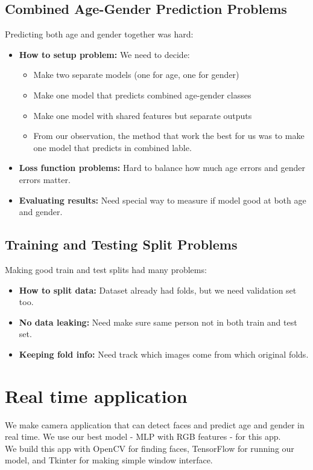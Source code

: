 \documentclass{article}
\begin{document}
\subsection{Combined Age-Gender Prediction Problems}
Predicting both age and gender together was hard:

\begin{itemize}
    \item \textbf{How to setup problem:} We need to decide:
    \begin{itemize}
        \item Make two separate models (one for age, one for gender)
        \item Make one model that predicts combined age-gender classes
        \item Make one model with shared features but separate outputs
        \item From our observation, the method that work the best for us was to make one model that predicts in combined lable.
    \end{itemize}



    \item \textbf{Loss function problems:} Hard to balance how much age errors and gender errors matter.

    \item \textbf{Evaluating results:} Need special way to measure if model good at both age and gender.
\end{itemize}

\subsection{Training and Testing Split Problems}
Making good train and test splits had many problems:

\begin{itemize}
    \item \textbf{How to split data:} Dataset already had folds, but we need validation set too.

    \item \textbf{No data leaking:} Need make sure same person not in both train and test set.

    \item \textbf{Keeping fold info:} Need track which images come from which original folds.
\end{itemize}


\newpage
\section{Real time application}
We make camera application that can detect faces and predict age and gender in real time.
We use our best model - MLP with RGB features - for this app.
\\
We build this app with OpenCV for finding faces, TensorFlow for running our model, and Tkinter for making simple window interface.
\\
\end{document}
